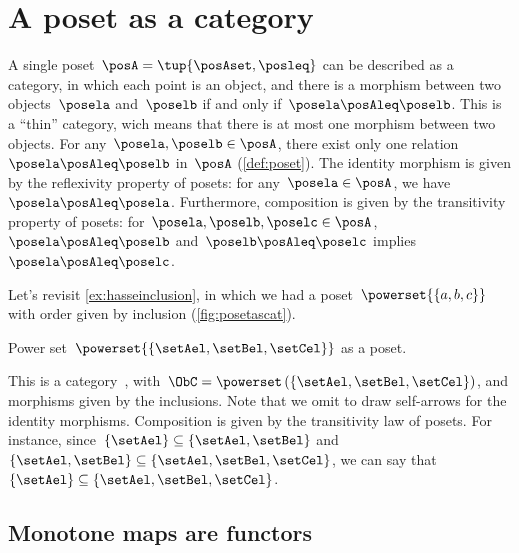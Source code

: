 

\section{A poset as a category}
\label{sec:posetsarecats}

A single poset~$\posA=\tup{\posAset, \posleq}$ can be described as a category, in which each point is an object, and there is a morphism between two objects~$\posela$ and~$\poselb$ if and only if~$\posela \posAleq \poselb$.
This is a ``thin'' category, wich means that there is at most one morphism between two objects.
For any~$\posela,\poselb\in \posA$, there exist only one relation~$\posela\posAleq \poselb$ in~$\posA$ (\cref{def:poset}).
The identity morphism is given by the reflexivity property of posets: for any~$\posela\in \posA$, we have~$\posela \posAleq \posela$.
Furthermore, composition is given by the transitivity property of posets: for~$\posela,\poselb,\poselc \in \posA$,~$\posela\posAleq \poselb$ and~$\poselb\posAleq \poselc$ implies~$\posela\posAleq \poselc$.

\begin{example}
    Let's revisit \cref{ex:hasseinclusion}, in which we had a poset~$\powerset{\{a,b,c\}}$ with order given by inclusion (\cref{fig:posetascat}).
    
    \begin{marginfigure}
        \centering
        \caption{Power set~$\powerset{\{\setAel,\setBel,\setCel\}}$ as a poset. \label{fig:posetascat}}
    \end{marginfigure}
    
    This is a category~\CatC, with~$\ObC=\powerset\left(\{\setAel,\setBel,\setCel\}\right)$, and morphisms given by the inclusions.
    Note that we omit to draw self-arrows for the identity morphisms.
    Composition is given by the transitivity law of posets.
    For instance, since~$\{\setAel\}\subseteq \{\setAel,\setBel\}$ and~$\{\setAel,\setBel\} \subseteq \{\setAel,\setBel,\setCel\}$, we can say that~$\{\setAel\}\subseteq \{\setAel,\setBel,\setCel\}$.
\end{example}

\subsection{Monotone maps are functors}

